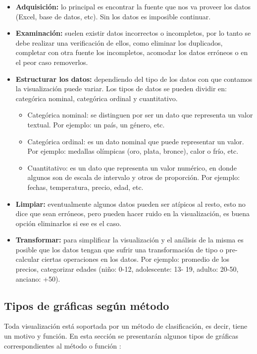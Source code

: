 \begin{itemize}
    \item\textbf{Adquisición:} lo principal es encontrar la fuente que nos va proveer los datos (Excel, base de datos, etc). Sin los datos es imposible continuar.
    \item\textbf{Examinación:} suelen existir datos incorrectos o incompletos, por lo tanto se debe realizar una verificación de ellos, como eliminar los duplicados, completar con otra fuente los incompletos, acomodar los datos erróneos o en el peor caso removerlos.
    \item\textbf{Estructurar los datos:} dependiendo del tipo de los datos con que contamos la visualización puede variar. Los tipos de datos se pueden dividir en: categórica nominal, categórica ordinal y cuantitativo.
    \begin{itemize}
        \item Categórica nominal: se distinguen por ser un dato que representa un valor textual. Por ejemplo: un país, un género, etc.
        \item Categórica ordinal: es un dato nominal que puede representar un valor. Por ejemplo: medallas olímpicas (oro, plata, bronce), calor o frío, etc.
        \item Cuantitativo: es un dato que representa un valor numérico, en donde algunos son de escala de intervalo y otros de proporción. Por ejemplo: fechas, temperatura, precio, edad, etc.
    \end{itemize}
    \item\textbf{Limpiar:} eventualmente algunos datos pueden ser atípicos al resto, esto no dice que sean erróneos, pero pueden hacer ruido en la visualización, es buena opción eliminarlos si ese es el caso.
    \item\textbf{Transformar:} para simplificar la visualización y el análisis de la misma es posible que los datos tengan que sufrir una transformación de tipo o pre-calcular ciertas operaciones en los datos. Por ejemplo: promedio de los precios, categorizar edades (niño: 0-12, adolescente: 13- 19, adulto: 20-50, anciano: +50).
\end{itemize}

\subsection{Tipos de gráficas según método}
Toda visualización está soportada por un método de clasificación, es decir, tiene un motivo y función. En esta sección se presentarán algunos tipos de gráficas correspondientes al método o función \cite{DataVis}: 

